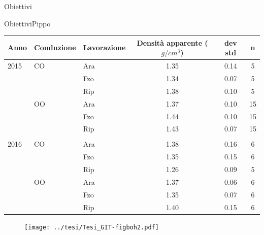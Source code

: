 \documentclass[10pt]{beamer}
\begin{document}
\begin{frame}{Obiettivi}
\begin{frame}{Obiettivi}{Pippo}
\begin{frame}[label=Core]

  \vspace{1.5cm}
  \hyperlink{densita}{}
  \footnotesize
  \begin{table}[ht]
    \centering
    \begin{tabular}{lllccc}
      \hline
      Anno & Conduzione & Lavorazione & Densit\`a apparente
                                        ($g/cm^3$) & dev std & n \\ 
      \hline
      2015 & CO & Ara & 1.35 & 0.14 &   5 \\ 
           &    & Fzo & 1.34 & 0.07 &   5 \\ 
           &    & Rip & 1.38 & 0.10 &   5 \\ 
           & OO & Ara & 1.37 & 0.10 &  15 \\ 
           &    & Fzo & 1.44 & 0.10 &  15 \\ 
           &    & Rip & 1.43 & 0.07 &  15 \\ 
      \\
      2016 & CO & Ara & 1.38 & 0.16 &   6 \\ 
           &    & Fzo & 1.35 & 0.15 &   6 \\ 
           &    & Rip & 1.26 & 0.09 &   5 \\ 
           & OO & Ara & 1.37 & 0.06 &   6 \\ 
           &    & Fzo & 1.35 & 0.07 &   6 \\ 
           &    & Rip & 1.40 & 0.15 &   6 \\ 
      \hline
    \end{tabular}
    \label{tab:RiassuntoDensitaCAmpo}
  \end{table}
\end{frame}


\begin{frame}
  \vspace{1.5cm}
  \begin{figure}
    \texttt{[image: ../tesi/Tesi\_GIT-figboh2.pdf]}
  \end{figure}
\end{frame}


\end{frame}
\end{frame}
\end{document}
